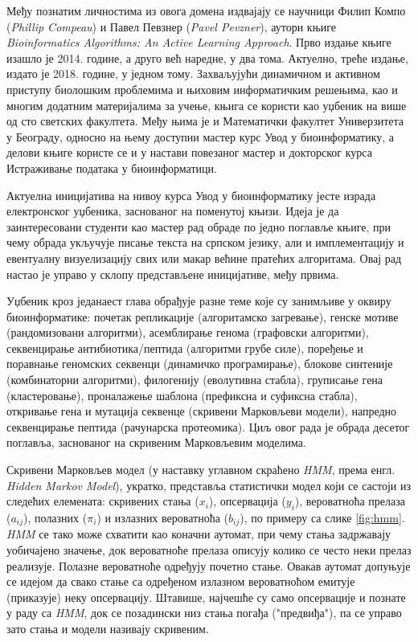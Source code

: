 \documentclass[12pt,oneside]{memoir}
\begin{document}
\begin{CJK}{UTF8}{ipxm}
Међу познатим личностима из овога домена издвајају се научници Филип Компо (\textit{Phillip Compeau}) и Павел Певзнер (\textit{Pavel Pevzner}), аутори књиге \textit{Bioinformatics Algorithms: An Active Learning Approach}. Прво издање књиге изашло је 2014. године, а друго већ наредне, у два тома. Актуелно, треће издање, издато је 2018. године, у једном тому. Захваљујући динамичном и активном приступу биолошким проблемима и њиховим информатичким решењима, као и многим додатним материјалима за учење, књига се користи као уџбеник на више од сто светских факултета\cite{ba}. Међу њима је и Математички факултет Универзитета у Београду, односно на њему доступни мастер курс Увод у биоинформатику, а делови књиге користе се и у настави повезаног мастер и докторског курса Истраживање података у биоинформатици\cite{matf}.

Актуелна иницијатива на нивоу курса Увод у биоинформатику јесте израда електронског уџбеника, заснованог на поменутој књизи. Идеја је да заинтересовани студенти као мастер рад обраде по једно поглавље књиге, при чему обрада укључује писање текста на српском језику, али и имплементацију и евентуалну визуелизацију свих или макар већине пратећих алгоритама. Овај рад настао је управо у склопу представљене иницијативе, међу првима.

Уџбеник кроз једанаест глава обрађује разне теме које су занимљиве у оквиру биоинформатике: почетак репликације (алгоритамско загревање), генске мотиве (рандомизовани алгоритми), асемблирање генома (графовски алгоритми), секвенцирање антибиотика/пептида (алгоритми грубе силе), поређење и поравнање геномских секвенци (динамичко програмирање), блокове синтеније (комбинаторни алгоритми), филогенију (еволутивна стабла), груписање гена (кластеровање), проналажење шаблона (префиксна и суфиксна стабла), откривање гена и мутација секвенце (скривени Марковљеви модели), напредно секвенцирање пептида (рачунарска протеомика). Циљ овог рада је обрада десетог поглавља, заснованог на скривеним Марковљевим моделима\cite{compeau2015}.

Скривени Марковљев модел (у наставку углавном скраћено \textit{HMM}, према енгл. \textit{Hidden Markov Model}), укратко, представља статистички модел који се састоји из следећих елемената: скривених стања ($x_i$), опсервација ($y_i$), вероватноћа прелаза ($a_{ij}$), полазних ($\pi_i$) и излазних вероватноћа ($b_{ij}$), по примеру са слике \ref{fig:hmm}. \textit{HMM} се тако може схватити као коначни аутомат, при чему стања задржавају уобичајено значење, док вероватноће прелаза описују колико се често неки прелаз реализује. Полазне вероватноће одређују почетно стање. Овакав аутомат допуњује се идејом да свако стање са одређеном излазном вероватноћом емитује (приказује) неку опсервацију. Штавише, најчешће су само опсервације и познате у раду са \textit{HMM}, док се позадински низ стања погађа ("предвиђа"), па се управо зато стања и модели називају скривеним\cite{stamp2021}.


\end{CJK}
\end{document}
